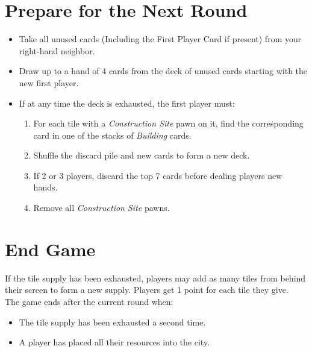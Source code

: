 \documentclass[12pt]{article}
\newenvironment{enumerateCustom}
{\begin{enumerate}
  \setlength{\itemsep}{1pt}
  \setlength{\parskip}{0pt}
  \setlength{\parsep}{0pt}}
{\end{enumerate}}
\newenvironment{itemizeCustom}
{\begin{itemize}
  \setlength{\itemsep}{1pt}
  \setlength{\parskip}{0pt}
  \setlength{\parsep}{0pt}}
{\end{itemize}}
\begin{document}
\begin{multicols*}{2}
\section*{Prepare for the Next Round}
\begin{itemizeCustom}
	\item Take all unused cards (Including the First Player Card if present) from your right-hand neighbor.
	\item Draw up to a hand of 4 cards from the deck of unused cards starting with the new first player.
	\item If at any time the deck is exhausted, the first player must:
	\begin{enumerateCustom}
		\item For each tile with a \emph{Construction Site} pawn on it, find the corresponding card in one of the stacks of \emph{Building} cards.
		\item Shuffle the discard pile and new cards to form a new deck.
		\item If 2 or 3 players, discard the top 7 cards before dealing players new hands.
		\item Remove all \emph{Construction Site} pawns.
	\end{enumerateCustom}
\end{itemizeCustom}

\section*{End Game}
If the tile supply has been exhausted, players may add as many tiles from behind their screen to form a new supply. Players get 1 point for each tile they give.\\
The game ends after the current round when:
\begin{itemizeCustom}
	\item The tile supply has been exhausted a second time.
	\item A player has placed all their resources into the city.
\end{itemizeCustom}


\end{multicols*}
\end{document}
